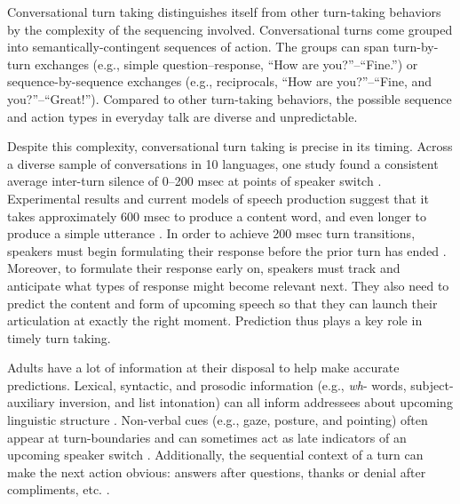 \documentclass[authoryear, 12pt]{elsarticle}
\begin{document}
Conversational turn taking distinguishes itself from other turn-taking behaviors by the complexity of the sequencing involved. Conversational turns come grouped into semantically-contingent sequences of action. The groups can span turn-by-turn exchanges (e.g., simple question--response, ``How are you?''--``Fine.'') or sequence-by-sequence exchanges (e.g., reciprocals, ``How are you?''--``Fine, and you?''--``Great!''). Compared to other turn-taking behaviors, the possible sequence and action types in everyday talk are diverse and unpredictable. 


Despite this complexity, conversational turn taking is precise in its timing. Across a diverse sample of conversations in 10 languages, one study found a consistent average inter-turn silence of 0--200 msec at points of speaker switch \citep{stivers2009}. Experimental results and current models of speech production suggest that it takes approximately 600 msec to produce a content word, and even longer to produce a simple utterance \citep{griffin2000, levelt1989}. In order to achieve 200 msec turn transitions, speakers must begin formulating their response before the prior turn has ended \citep{levinson2013, levinson2016}. Moreover, to formulate their response early on, speakers must track and anticipate what types of response might become relevant next. They also need to predict the content and form of upcoming speech so that they can launch their articulation at exactly the right moment. Prediction thus plays a key role in timely turn taking.

Adults have a lot of information at their disposal to help make accurate predictions. Lexical, syntactic, and prosodic information (e.g., \textit{wh}- words, subject-auxiliary inversion, and list intonation) can all inform addressees about upcoming linguistic structure \citep{de-ruiter2006, duncan1972, ford1996, torreira2015}. Non-verbal cues (e.g., gaze, posture, and pointing) often appear at turn-boundaries and can sometimes act as late indicators of an upcoming speaker switch \citep{rossano2009, stivers2010}. Additionally, the sequential context of a turn can make the next action obvious: answers after questions, thanks or denial after compliments, etc. \citep{schegloff2007}.
\end{document}
